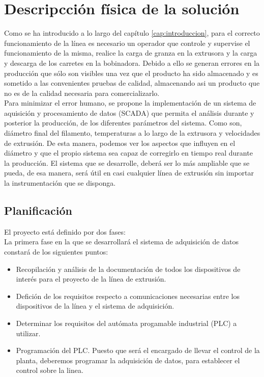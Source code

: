 \chapter{Descripcción física de la solución}
\label{cap:descrip}

Como se ha introducido a lo largo del capítulo \ref{cap:introduccion}, para el correcto funcionamiento de la línea es necesario un operador que controle y supervise el funcionamiento de la misma, realice la carga de granza en la extrusora y la carga y descarga de los carretes en la bobinadora. Debido a ello se generan errores en la producción que sólo son visibles una vez que el producto ha sido almacenado y es sometido a las convenientes pruebas de calidad, almacenando asi un producto que no es de la calidad necesaria para comercializarlo.\\

Para minimizar el error humano, se propone la implementación de un sistema de aquisición y procesamiento de datos (SCADA) que permita el análisis durante y posterior la producción, de los diferentes parámetros del sistema. Como son, diámetro final del filamento, temperaturas a lo largo de la extrusora y velocidades de extrusión. De esta manera, podemos ver los aspectos que influyen en el diámetro y que el propio sistema sea capaz de corregirlo en tiempo real durante la producción. El sistema que se desarrolle, deberá ser lo más ampliable que se pueda, de esa manera, será útil en casi cualquier línea de extrusión sin importar la instrumentación que se disponga.

\section{Planificación}
\label{sec:planificacion}

El proyecto está definido por dos fases:\\

La primera fase en la que se desarrollará el sistema de adquisición de datos constará de los siguientes puntos:

\begin{itemize}
    \item Recopilación y análisis de la documentación de todos los dispositivos de interés para el proyecto de la línea de extrusión.
    \item Defición de los requisitos respecto a comunicaciones necesarias entre los dispositivos de la línea y el sistema de adquisición.
    \item Determinar los requisitos del autómata progamable industrial (PLC) a utilizar.
    \item Programación del PLC. Puesto que será el encargado de llevar el control de la planta, deberemos programar la adquisición de datos, para establecer el control sobre la linea.
\end{itemize}

